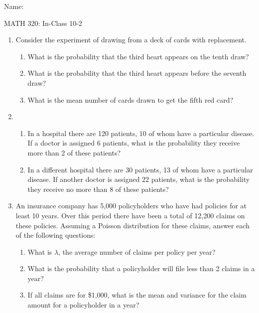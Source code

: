 \documentclass{article}
\begin{document}
\hspace{375pt}Name:

\begin{center}
{\Huge MATH 320: In-Class 10-2}

\end{center}
\bigskip\bigskip

\begin{enumerate}
    \item Consider the experiment of drawing from a deck of cards with replacement.%
    \begin{enumerate}
        \item What is the probability that the third heart appears on the tenth draw?\vspace{100pt}
        \item What is the probability that the third heart appears before the seventh draw?\vspace{100pt}
        \item What is the mean number of cards drawn to get the fifth red card?\vspace{60pt}
    \end{enumerate}
    
    \item 
    \begin{enumerate} %
        \item In a hospital there are 120 patients, 10 of whom have a particular disease. If a doctor is assigned 6 patients, what is the probability they receive more than 2 of these patients?\vspace{100pt}
        \item In a different hospital there are 30 patients, 13 of whom have a particular disease. If another doctor is assigned 22 patients, what is the probability they receive no more than 8 of these patients?\vspace{100pt}
    \end{enumerate}
    
    \item An insurance company has 5,000 policyholders who have had policies for at least 10 years. Over this period there have been a total of 12,200 claims on these policies. Assuming a Poisson distribution for these claims, answer each of the following questions:%
    \begin{enumerate}
        \item What is $\lambda$, the average number of claims per policy per year?\vspace{40pt}
        \item What is the probability that a policyholder will file less than 2 claims in a year?\vspace{100pt}
        \item If all claims are for \$1,000, what is the mean and variance for the claim amount for a policyholder in a year?\vspace{100pt}
    \end{enumerate}
    

\end{enumerate}
\end{document}
